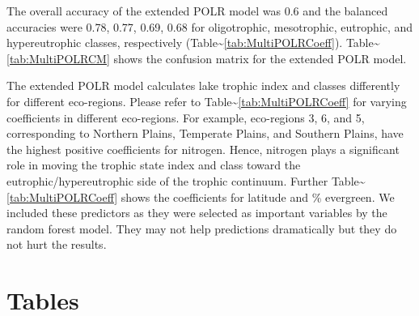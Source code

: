 \documentclass[fleqn,10pt,lineno]{wlpeerj} %
\begin{document}
The overall accuracy of the extended POLR model was 0.6 and the balanced accuracies were 0.78, 0.77, 0.69, 0.68 for oligotrophic, mesotrophic, eutrophic, and hypereutrophic classes, respectively (Table\textasciitilde{}\ref{tab:MultiPOLRCoeff}). Table\textasciitilde{}\ref{tab:MultiPOLRCM} shows the confusion matrix for the extended POLR model.

The extended POLR model calculates lake trophic index and classes differently for different eco-regions. Please refer to Table\textasciitilde{}\ref{tab:MultiPOLRCoeff} for varying coefficients in different eco-regions. For example, eco-regions 3, 6, and 5, corresponding to Northern Plains, Temperate Plains, and Southern Plains, have the highest positive coefficients for nitrogen. Hence, nitrogen plays a significant role in moving the trophic state index and class toward the eutrophic/hypereutrophic side of the trophic continuum. Further Table\textasciitilde{}\ref{tab:MultiPOLRCoeff} shows the coefficients for latitude and \% evergreen. We included these predictors as they were selected as important variables by the random forest model. They may not help predictions dramatically but they do not hurt the results.

\hypertarget{tables}{%
\section*{Tables}\label{tables}}
\end{document}
